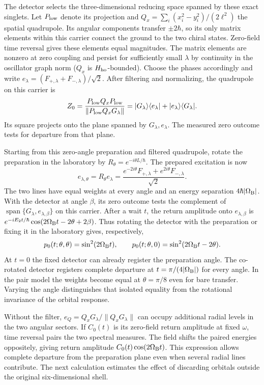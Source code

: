 \documentclass[11pt]{article}
\theoremstyle{definition}
\DeclareMathOperator{\Span}{span}
\newcommand{\ket}[1]{\lvert #1\rangle}
\newcommand{\bra}[1]{\langle #1\rvert}
\begin{document}
The detector selects the three-dimensional reducing space spanned by these exact singlets. Let $P_{\rm low}$ denote its projection and $Q_x=\sum_i(x_i^2-y_i^2)/(2\ell^2)$ the spatial quadrupole. Its angular components transfer $\pm2\hbar$, so its only matrix elements within this carrier connect the ground to the two chiral states. Zero-field time reversal gives these elements equal magnitudes. The matrix elements are nonzero at zero coupling and persist for sufficiently small $\lambda$ by continuity in the oscillator graph norm ($Q_x$ is $H_{\rm ho}$-bounded). Choose the phases accordingly and write $e_\lambda=(F_{+,\lambda}+F_{-,\lambda})/\sqrt2$. After filtering and normalizing, the quadrupole on this carrier is
\[
 Z_0=\frac{P_{\rm low}Q_x P_{\rm low}}{\|P_{\rm low}Q_xG_\lambda\|}
 =\ket{G_\lambda}\bra{e_\lambda}+\ket{e_\lambda}\bra{G_\lambda}.
\]
Its square projects onto the plane spanned by $G_\lambda,e_\lambda$. The measured zero outcome tests for departure from that plane.

Starting from this zero-angle preparation and filtered quadrupole, rotate the preparation in the laboratory by $R_\theta=e^{-i\theta L/\hbar}$. The prepared excitation is now
\[
 e_{\lambda,\theta}=R_\theta e_\lambda
 =\frac{e^{-2i\theta}F_{+,\lambda}+e^{2i\theta}F_{-,\lambda}}{\sqrt2}.
\]
The two lines have equal weights at every angle and an energy separation $4\hbar|\Omega_{\rm B}|$. With the detector at angle $\beta$, its zero outcome tests the complement of $\Span\{G_\lambda,e_{\lambda,\beta}\}$ on this carrier. After a wait $t$, the return amplitude onto $e_{\lambda,\beta}$ is $e^{-iE_2t/\hbar}\cos(2\Omega_{\rm B}t-2\theta+2\beta)$. Thus rotating the detector with the preparation or fixing it in the laboratory gives, respectively,
\begin{equation}
 p_0(t;\theta,\theta)=\sin^2(2\Omega_{\rm B}t),\qquad
 p_0(t;\theta,0)=\sin^2(2\Omega_{\rm B}t-2\theta).
 \label{eq:rotated-orbital-readout}
\end{equation}
At $t=0$ the fixed detector can already register the preparation angle. The co-rotated detector registers complete departure at $t=\pi/(4|\Omega_{\rm B}|)$ for every angle. In the pair model the weights become equal at $\theta=\pi/8$ even for bare transfer. Varying the angle distinguishes that isolated equality from the rotational invariance of the orbital response.

Without the filter, $e_Q=Q_xG_\lambda/\|Q_xG_\lambda\|$ can occupy additional radial levels in the two angular sectors. If $C_0(t)$ is its zero-field return amplitude at fixed $\omega$, time reversal pairs the two spectral measures. The field shifts the paired energies oppositely, giving return amplitude $C_0(t)\cos(2\Omega_{\rm B}t)$. This expression allows complete departure from the preparation plane even when several radial lines contribute. The next calculation estimates the effect of discarding orbitals outside the original six-dimensional shell.
\end{document}
